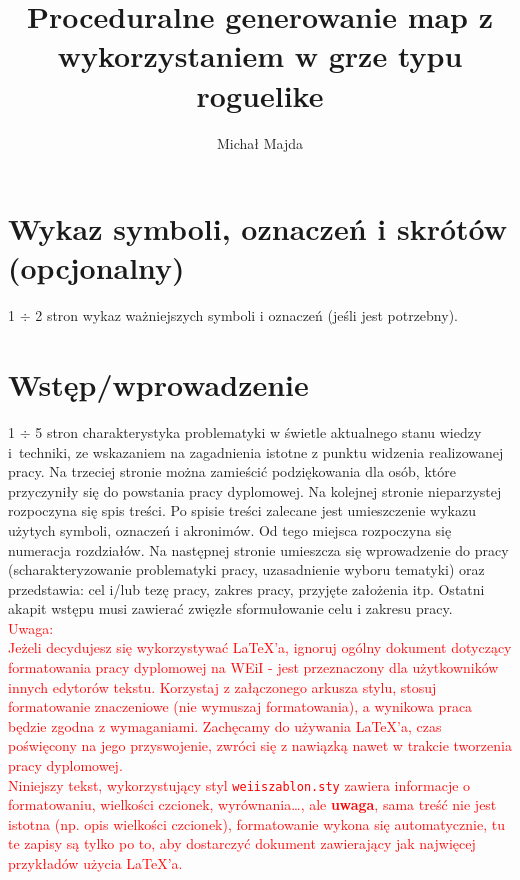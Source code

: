 \documentclass[12pt,twoside]{article}
\author{Michał Majda}
\title{Proceduralne generowanie map z wykorzystaniem w grze typu roguelike }
\begin{document}
\maketitle

\blankpage

\tableofcontents

\clearpage
\blankpage


\section*{Wykaz symboli, oznaczeń i skrótów (opcjonalny)}
%

1 $\div$ 2 stron wykaz ważniejszych symboli i oznaczeń (jeśli jest potrzebny).
\clearpage

\section{Wstęp/wprowadzenie}
1 $\div$ 5 stron charakterystyka problematyki w świetle aktualnego stanu wiedzy i~techniki, ze wskazaniem na zagadnienia istotne z punktu widzenia realizowanej pracy.
Na trzeciej stronie można zamieścić podziękowania dla osób, które przyczyniły się do powstania pracy dyplomowej. Na kolejnej stronie nieparzystej rozpoczyna się spis treści. Po spisie treści zalecane jest umieszczenie wykazu użytych symboli, oznaczeń i akronimów. Od tego miejsca rozpoczyna się numeracja rozdziałów. Na następnej stronie umieszcza się wprowadzenie do pracy (scharakteryzowanie problematyki pracy, uzasadnienie wyboru tematyki) oraz przedstawia: cel i/lub tezę pracy, zakres pracy, przyjęte założenia itp.
Ostatni akapit wstępu musi zawierać zwięzłe sformułowanie celu i zakresu pracy. 
\\
\textcolor{red}{
Uwaga: \\
Jeżeli decydujesz się wykorzystywać \LaTeX'a, ignoruj ogólny dokument dotyczący formatowania pracy dyplomowej na WEiI - jest przeznaczony dla użytkowników innych edytorów tekstu. Korzystaj z załączonego arkusza stylu, stosuj formatowanie znaczeniowe (nie wymuszaj formatowania), a wynikowa praca będzie zgodna z wymaganiami. Zachęcamy do używania \LaTeX'a, czas poświęcony na jego przyswojenie, zwróci się z nawiązką nawet w trakcie tworzenia pracy dyplomowej. \\
Niniejszy tekst, wykorzystujący  styl \texttt{weiiszablon.sty} zawiera informacje o formatowaniu, wielkości czcionek, wyrównania\ldots, ale \textbf{uwaga}, sama treść nie jest istotna (np. opis wielkości czcionek), 
formatowanie wykona się automatycznie, tu te zapisy są tylko po to, aby dostarczyć dokument zawierający jak najwięcej przykładów użycia \LaTeX'a.
}
\end{document}
